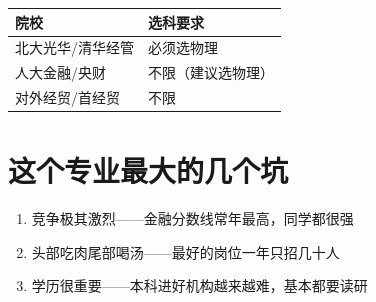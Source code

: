 \documentclass[a4paper,12pt]{ctexart}
\begin{document}
\begin{tabular}{ll}
\toprule
院校 & 选科要求 \\
\midrule
北大光华/清华经管 & 必须选物理 \\
人大金融/央财 & 不限（建议选物理） \\
对外经贸/首经贸 & 不限 \\
\bottomrule
\end{tabular}

\section{这个专业最大的几个坑}

\begin{enumerate}
  \item 竞争极其激烈——金融分数线常年最高，同学都很强
  \item 头部吃肉尾部喝汤——最好的岗位一年只招几十人
  \item 学历很重要——本科进好机构越来越难，基本都要读研
\end{enumerate}
\end{document}
